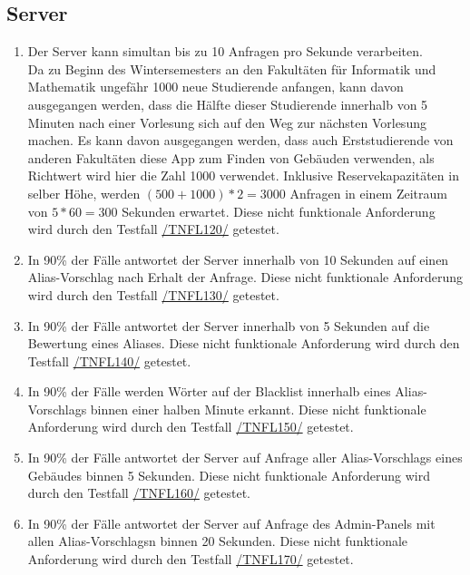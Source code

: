 \subsection*{Server}

\begin{samepage}
    \begin{enumerate}[label=\textbf{/NFL\arabic*0/}, align=left, start=12]
        \item \label{/NFL120/} Der \Gls{Server} kann \gls{simultan} bis zu 10 Anfragen pro Sekunde verarbeiten. \\
              Da zu Beginn des Wintersemesters an den Fakultäten für Informatik und Mathematik ungefähr 1000 neue Studierende anfangen,
              kann davon ausgegangen werden, dass die Hälfte dieser Studierende innerhalb von 5 Minuten nach einer Vorlesung sich auf den Weg zur nächsten Vorlesung machen.
              Es kann davon ausgegangen werden, dass auch Erststudierende von anderen Fakultäten diese App zum Finden von Gebäuden verwenden, als Richtwert wird hier die Zahl 1000 verwendet.
              Inklusive Reservekapazitäten in selber Höhe, werden $(500 + 1000) * 2 = 3000$ Anfragen in einem Zeitraum von $5 * 60 = 300$ Sekunden erwartet.
              Diese nicht funktionale Anforderung wird durch den Testfall \hyperref[/TNFL120/]{/TNFL120/} getestet.
        \item \label{/NFL130/} In 90\% der Fälle antwortet der \Gls{Server} innerhalb von 10 Sekunden auf einen \Gls{Alias-Vorschlag} nach Erhalt der Anfrage. Diese nicht funktionale Anforderung wird durch den Testfall \hyperref[/TNFL130/]{/TNFL130/} getestet.
        \item \label{/NFL140/} In 90\% der Fälle antwortet der \Gls{Server} innerhalb von 5 Sekunden auf die Bewertung eines Aliases. Diese nicht funktionale Anforderung wird durch den Testfall \hyperref[/TNFL140/]{/TNFL140/} getestet.
        \item \label{/NFL150/} In 90\% der Fälle werden Wörter auf der \Gls{Blacklist} innerhalb eines \Gls{Alias-Vorschlag}s binnen einer halben Minute erkannt. Diese nicht funktionale Anforderung wird durch den Testfall \hyperref[/TNFL150/]{/TNFL150/} getestet.
        \item \label{/NFL160/} In 90\% der Fälle antwortet der \Gls{Server} auf Anfrage aller \Glspl{Alias-Vorschlag} eines Gebäudes binnen 5 Sekunden. Diese nicht funktionale Anforderung wird durch den Testfall \hyperref[/TNFL160/]{/TNFL160/} getestet.
        \item \label{/NFL170/} In 90\% der Fälle antwortet der \Gls{Server} auf Anfrage des \Gls{Admin-Panel}s mit allen \Glspl{Alias-Vorschlag}n binnen 20 Sekunden. Diese nicht funktionale Anforderung wird durch den Testfall \hyperref[/TNFL170/]{/TNFL170/} getestet.
    \end{enumerate}
\end{samepage}
